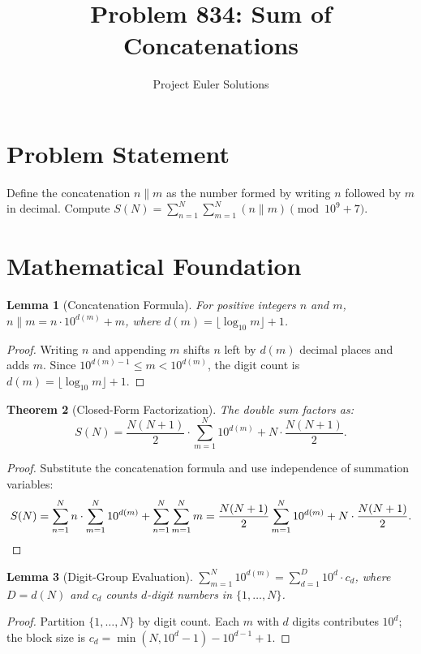 \documentclass[11pt]{article}
\title{Problem 834: Sum of Concatenations}
\author{Project Euler Solutions}
\date{}
\newtheorem{theorem}{Theorem}
\newtheorem{lemma}[theorem]{Lemma}
\begin{document}
\maketitle

\section{Problem Statement}

Define the concatenation $n\|m$ as the number formed by writing $n$ followed by $m$ in decimal. Compute $S(N) = \sum_{n=1}^{N}\sum_{m=1}^{N}(n\|m) \pmod{10^9+7}$.

\section{Mathematical Foundation}

\begin{lemma}[Concatenation Formula]
For positive integers $n$ and $m$, $n\|m = n\cdot 10^{d(m)}+m$, where $d(m)=\lfloor\log_{10}m\rfloor+1$.
\end{lemma}

\begin{proof}
Writing $n$ and appending $m$ shifts $n$ left by $d(m)$ decimal places and adds $m$. Since $10^{d(m)-1}\le m<10^{d(m)}$, the digit count is $d(m)=\lfloor\log_{10}m\rfloor+1$.
\end{proof}

\begin{theorem}[Closed-Form Factorization]
The double sum factors as:
\[
S(N) = \frac{N(N+1)}{2}\cdot\sum_{m=1}^{N}10^{d(m)} + N\cdot\frac{N(N+1)}{2}.
\]
\end{theorem}

\begin{proof}
Substitute the concatenation formula and use independence of summation variables:
\[
S(N) = \sum_{n=1}^{N}n\cdot\sum_{m=1}^{N}10^{d(m)} + \sum_{n=1}^{N}\sum_{m=1}^{N}m = \frac{N(N+1)}{2}\sum_{m=1}^{N}10^{d(m)} + N\cdot\frac{N(N+1)}{2}. \qedhere
\]
\end{proof}

\begin{lemma}[Digit-Group Evaluation]
$\displaystyle\sum_{m=1}^{N}10^{d(m)} = \sum_{d=1}^{D}10^d\cdot c_d$, where $D=d(N)$ and $c_d$ counts $d$-digit numbers in $\{1,\ldots,N\}$.
\end{lemma}

\begin{proof}
Partition $\{1,\ldots,N\}$ by digit count. Each $m$ with $d$ digits contributes $10^d$; the block size is $c_d=\min(N,10^d-1)-10^{d-1}+1$.
\end{proof}
\end{document}

